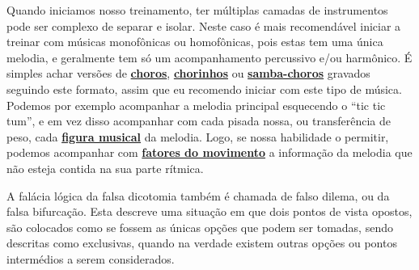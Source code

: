 \begin{example}
Quando iniciamos nosso treinamento, 
ter múltiplas camadas de instrumentos pode ser complexo de separar e isolar.
Neste caso é mais recomendável iniciar a treinar com músicas monofônicas ou  homofônicas,
pois estas tem uma única melodia, e geralmente tem só um acompanhamento percussivo e/ou harmônico.
É simples achar versões de \hyperref[subsec:musicchoro]{\textbf{choros}}, 
\hyperref[subsec:musicchoro]{\textbf{chorinhos}} ou 
\hyperref[subsec:musicsambachoro]{\textbf{samba-choros}} gravados seguindo este formato,
assim que eu recomendo iniciar com este tipo de música.
Podemos por exemplo acompanhar a melodia principal esquecendo o ``tic tic tum'',
e em vez disso acompanhar com cada pisada nossa, ou transferência de peso, 
cada \hyperref[sec:figurasmusicais]{\textbf{figura musical}} da melodia. Logo, 
se nossa habilidade o permitir, podemos acompanhar com \hyperref[subsec:fatordinamica]{\textbf{fatores do movimento}}
a informação da melodia que não esteja contida na sua parte rítmica.
\end{example}






\begin{elaboracion}[title=Falácia lógica da falsa dicotomia, width= 1.0\linewidth]
\label{ref:falsadilema}
A falácia lógica da falsa dicotomia também é chamada de falso dilema, ou da falsa bifurcação. 
Esta descreve uma situação em que dois pontos de vista opostos, 
são colocados como se fossem as únicas opções que podem ser tomadas, sendo descritas como exclusivas,
quando na verdade existem outras opções ou pontos intermédios a serem considerados.
\end{elaboracion}


